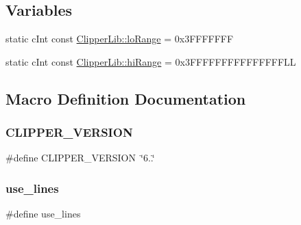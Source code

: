 \subsection*{Variables}
\begin{DoxyCompactItemize}
\item 
static c\+Int const \mbox{\hyperlink{namespace_clipper_lib_abc3cf08ce02b48ae18c320fd492108f1}{Clipper\+Lib\+::lo\+Range}} = 0x3\+F\+F\+F\+F\+F\+FF
\item 
static c\+Int const \mbox{\hyperlink{namespace_clipper_lib_a65945fbc810bff7fd44c981b06e4473e}{Clipper\+Lib\+::hi\+Range}} = 0x3\+F\+F\+F\+F\+F\+F\+F\+F\+F\+F\+F\+F\+F\+F\+F\+LL
\end{DoxyCompactItemize}


\subsection{Macro Definition Documentation}
\mbox{\label{clipper_8hh_a613f7ecb44b1e27f0045d351d221bc79}} 
\subsubsection{\texorpdfstring{CLIPPER\_VERSION}{CLIPPER\_VERSION}}
{\footnotesize\ttfamily \#define C\+L\+I\+P\+P\+E\+R\+\_\+\+V\+E\+R\+S\+I\+ON~\char`\"{}6..\char`\"{}}

\mbox{\label{clipper_8hh_a64da78e55d3fed37bd313ab82245a96a}} 
\subsubsection{\texorpdfstring{use\_lines}{use\_lines}}
{\footnotesize\ttfamily \#define use\+\_\+lines}


